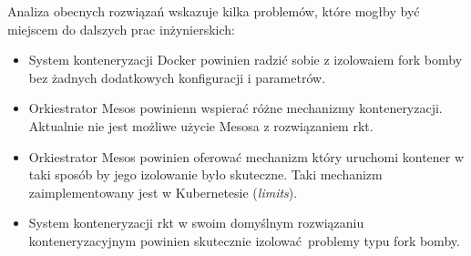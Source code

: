 \documentclass[10pt,a4paper,titlepage,twoside]{report}
\begin{document}
Analiza obecnych rozwiązań wskazuje kilka problemów, które mogłby być miejscem do dalszych prac inżynierskich:
\begin{itemize}
\item System konteneryzacji Docker powinien radzić sobie z izolowaiem fork bomby bez żadnych dodatkowych konfiguracji i parametrów.
\item Orkiestrator Mesos powinienn wspierać różne mechanizmy konteneryzacji. Aktualnie nie jest możliwe użycie Mesosa z rozwiązaniem rkt.
\item Orkiestrator Mesos powinien oferować mechanizm który uruchomi kontener w taki sposób by jego izolowanie było skuteczne. Taki mechanizm zaimplementowany jest w Kubernetesie (\textit{limits}).
\item System konteneryzacji rkt w swoim domyślnym rozwiązaniu konteneryzacyjnym powinien skutecznie izolować problemy typu fork bomby.
\end{itemize}

\listoffigures
{}

\newpage

\listoftables
{}
\end{document}
